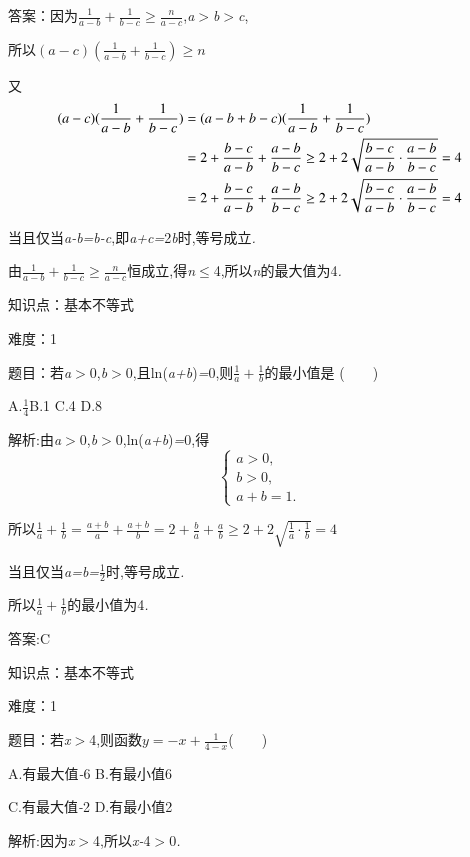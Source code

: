 \documentclass{article} %
\begin{document}
 答案：因为$\frac{1}{a-b}+\frac{1}{b-c} \ge \frac{n}{a-c}$,\textit{a$>$b$>$c},

所以$(a-c)(\frac{1}{a-b}+\frac{1}{b-c}) \ge n$

又
\begin{align}
\notag
(a-c)(\frac{1}{a-b}+\frac{1}{b-c})&=(a-b+b-c)(\frac{1}{a-b}+\frac{1}{b-c})\\ \notag
&=	2+\frac{b-c}{a-b}+\frac{a-b}{b-c}\ge 2+2\sqrt{\frac{b-c}{a-b}\cdot \frac{a-b}{b-c}}=4 \\ \notag
&=2+\frac{b-c}{a-b}+ \frac{a-b}{b-c} \ge 2+2\sqrt{\frac{b-c}{a-b}\cdot \frac{a-b}{b-c}}=4
\end{align}


当且仅当\textit{a-b=b-c},即\textit{a+c=}2\textit{b}时,等号成立\textit{.}

由$\frac{1}{a-b}+\frac{1}{b-c} \ge \frac{n}{a-c}$恒成立,得\textit{n}$\mathrm{\le}$4,所以\textit{n}的最大值为4\textit{.}





知识点：基本不等式

难度：1

 题目：若\textit{a$>$}0,\textit{b$>$}0,且ln(\textit{a+b})\textit{=}0,则$\frac{1}{a}+\frac{1}{b}$的最小值是 (\textit{　　})

 

 A.$\frac{1}{4}$B.1 C.4 D.8

 解析:由\textit{a$>$}0,\textit{b$>$}0,ln(\textit{a+b})\textit{=}0,得
\[
\begin{cases}
a>0,\\
b>0,\\
a+b=1.
\end{cases}
\]


所以$ \frac{1}{a}+\frac{1}{b}=\frac{a+b}{a}+\frac{a+b}{b}=2+\frac{b}{a}+\frac{a}{b}\ge 2+2\sqrt{\frac{1}{a}\cdot \frac{1}{b}}=4$


当且仅当\textit{a=b=}$\frac{1}{2}$时,等号成立\textit{.}

所以$\frac{1}{a}+\frac{1}{b}$的最小值为4\textit{.}

 答案:C

知识点：基本不等式

难度：1

 题目：若\textit{x$>$}4,则函数$y=-x+\frac{1}{4-x}$(\textit{　　})

 A.有最大值\textit{-}6 B.有最小值6

 C.有最大值\textit{-}2 D.有最小值2

 解析:因为\textit{x$>$}4,所以\textit{x-}4\textit{$>$}0\textit{.}
\end{document}
